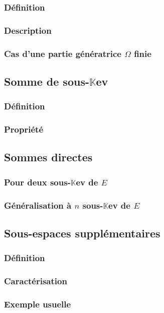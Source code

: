 \documentclass[12pt,a4paper,french]{book}
\begin{document}
			\subsubsection{Définition}
			\subsubsection{Description}
			\subsubsection{Cas d'une partie génératrice $\Omega$ finie}
		\subsection{Somme de sous-$\mathbb{K}$ev}
			\subsubsection{Définition}
			\subsubsection{Propriété}
		\subsection{Sommes directes}
			\subsubsection{Pour deux sous-$\mathbb{K}$ev de $E$}
			\subsubsection{Généralisation à  $n$ sous-$\mathbb{K}$ev de $E$}
		\subsection{Sous-espaces supplémentaires}
			\subsubsection{Définition}
			\subsubsection{Caractérisation}
			\subsubsection{Exemple usuelle}
\end{document}
